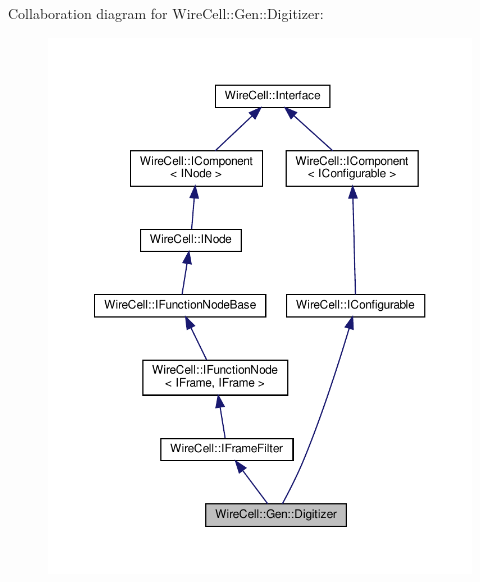 Collaboration diagram for Wire\+Cell\+:\+:Gen\+:\+:Digitizer\+:
\nopagebreak
\begin{figure}[H]
\begin{center}
\leavevmode
\includegraphics[width=350pt]{class_wire_cell_1_1_gen_1_1_digitizer__coll__graph}
\end{center}
\end{figure}

